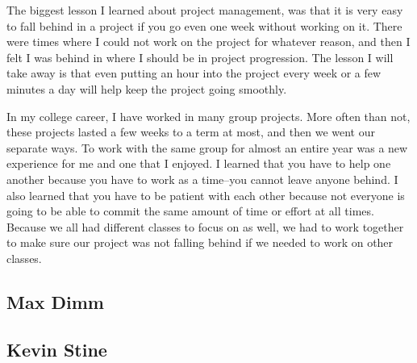 \documentclass[letterpaper,10pt,draftclsnofoot,onecolumn,titlepage]{IEEEtran}
\begin{document}
		
		The biggest lesson I learned about project management, was that it is very easy to fall behind in a project if you go even one week without working on it. 
		There were times where I could not work on the project for whatever reason, and then I felt I was behind in where I should be in project progression. 
		The lesson I will take away is that even putting an hour into the project every week or a few minutes a day will help keep the project going smoothly. 
		
		In my college career, I have worked in many group projects. 
		More often than not, these projects lasted a few weeks to a term at most, and then we went our separate ways. 
		To work with the same group for almost an entire year was a new experience for me and one that I enjoyed. 
		I learned that you have to help one another because you have to work as a time--you cannot leave anyone behind. 
		I also learned that you have to be patient with each other because not everyone is going to be able to commit the same amount of time or effort at all times. 
		Because we all had different classes to focus on as well, we had to work together to make sure our project was not falling behind if we needed to work on other classes. 
		
	
	\subsection{Max Dimm}
	
	\subsection{Kevin Stine}
	
	
	
	
\end{document}
